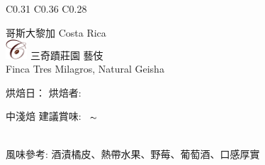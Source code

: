 \documentclass[10pt,a4paper]{article}
\begin{document}
\begin{tabular}{C{0.31\textwidth} C{0.36\textwidth} C{0.28\textwidth}}
{{哥斯大黎加 %
\large
Costa Rica%
}\\
{ \hspace*{-0.66cm}\includegraphics[trim=0 20em 0 -20em,width=0.06\textwidth]{NEWC.png}%
\Large \hspace*{0.1em} \vspace*{0.15cm}  
\hspace*{0.4em}三奇蹟莊園 {\color{Sepia}藝伎}%
}\vspace*{0.15em}\\
{ 
Finca Tres Milagros, Natural {\color{Sepia}Geisha} %
}\vspace*{0.25em}\\
\setdatetoday \addtocounter{datenumber}{
-1%
}\setdatebynumber{\thedatenumber}
{\scriptsize 烘焙日：{\scriptsize\datedate}\hspace{0.3em}%
烘焙者: \textbf{\scriptsize{}}}\vspace*{-0.3em}\\
 \addtocounter{datenumber}{
5 }%
\setdatebynumber{\thedatenumber} 
{\normalsize 
中淺焙%
\enskip \scriptsize 建議賞味:} \scriptsize{\datemonthname ~\thedateday}$\thicksim$\addtocounter{datenumber}{55}\setdatebynumber{\thedatenumber} \datedate
\\\scriptsize 風味參考: 酒漬橘皮、熱帶水果、野莓、葡萄酒、口感厚實
}
\end{tabular}
\end{document}
